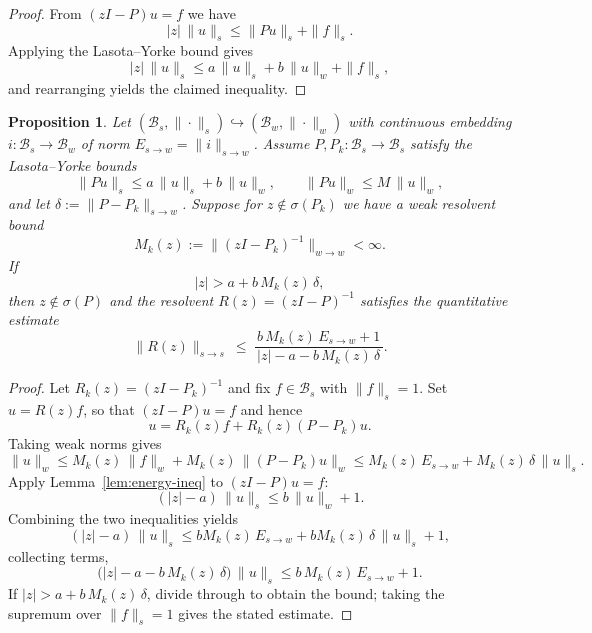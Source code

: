 \documentclass[11pt]{article}
\newtheorem{proposition}[definition]{Proposition}
\begin{document}
\begin{proof}
From $(zI-P)u=f$ we have
\[
|z|\,\|u\|_s \le \|Pu\|_s + \|f\|_s.
\]
Applying the Lasota--Yorke bound gives
\[
|z|\,\|u\|_s \le a\,\|u\|_s + b\,\|u\|_w + \|f\|_s,
\]
and rearranging yields the claimed inequality.
\end{proof}

\begin{proposition}
\label{prop:weak-to-strong-bridge}
Let $(\mathcal B_s,\|\cdot\|_s)\hookrightarrow(\mathcal B_w,\|\cdot\|_w)$ with continuous embedding
$i:\mathcal B_s\to\mathcal B_w$ of norm $E_{s\to w}=\|i\|_{s\to w}$.
Assume $P,P_k:\mathcal B_s\to\mathcal B_s$ satisfy the Lasota--Yorke bounds
\[
\|Pu\|_s \le a\,\|u\|_s + b\,\|u\|_w, \qquad
\|Pu\|_w \le M\,\|u\|_w,
\]
and let $\delta:=\|P-P_k\|_{s\to w}$.
Suppose for $z\notin\sigma(P_k)$ we have a weak resolvent bound
\[
M_k(z):=\|(zI-P_k)^{-1}\|_{w\to w} < \infty.
\]
If
\[
|z| > a + b\,M_k(z)\,\delta,
\]
then $z\notin\sigma(P)$ and the resolvent $R(z)=(zI-P)^{-1}$
satisfies the quantitative estimate
\[
\boxed{\;
\|R(z)\|_{s\to s}
\ \le\
\frac{\,b\,M_k(z)\,E_{s\to w} + 1\,}{\,|z|-a - b\,M_k(z)\,\delta\,}.
\;}
\]
\end{proposition}

\begin{proof}
Let $R_k(z)=(zI-P_k)^{-1}$ and fix $f\in\mathcal B_s$ with $\|f\|_s=1$.
Set $u=R(z)f$, so that $(zI-P)u=f$ and hence
\[
u = R_k(z)f + R_k(z)(P-P_k)u.
\]
Taking weak norms gives
\[
\|u\|_w
 \le M_k(z)\,\|f\|_w + M_k(z)\,\|(P-P_k)u\|_w
 \le M_k(z)\,E_{s\to w} + M_k(z)\,\delta\,\|u\|_s.
\]
Apply Lemma~\ref{lem:energy-ineq} to $(zI-P)u=f$:
\[
(|z|-a)\,\|u\|_s \le b\,\|u\|_w + 1.
\]
Combining the two inequalities yields
\[
(|z|-a)\,\|u\|_s \le b M_k(z)\,E_{s\to w} + b M_k(z)\,\delta\,\|u\|_s + 1,
\]
collecting terms,
\[
\big(|z|-a - b\,M_k(z)\,\delta\big)\,\|u\|_s
   \le b\,M_k(z)\,E_{s\to w} + 1.
\]
If $|z|>a+b\,M_k(z)\,\delta$, divide through to obtain the bound;
taking the supremum over $\|f\|_s=1$ gives the stated estimate.
\end{proof}






\end{document}
